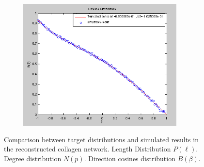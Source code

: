 \begin{figure}[h!]
\begin{subfigure}{0.7\textwidth}
    \includegraphics[width=0.92\textwidth]{Figures/chapter-reconstruct/cosinesN10000.png}%
    \label{collagen_cosines}
  \end{subfigure}

\caption[Collagen: comparing target and simulated distributions]{ Comparison
between target distributions and simulated results in the reconstructed collagen
network.
 Length Distribution $P(\ell)$.
 Degree distribution $N(p)$.
 Direction cosines distribution $B(\beta)$.
}
\label{fig:collagen-distributions}
\end{figure}

%
%
%
